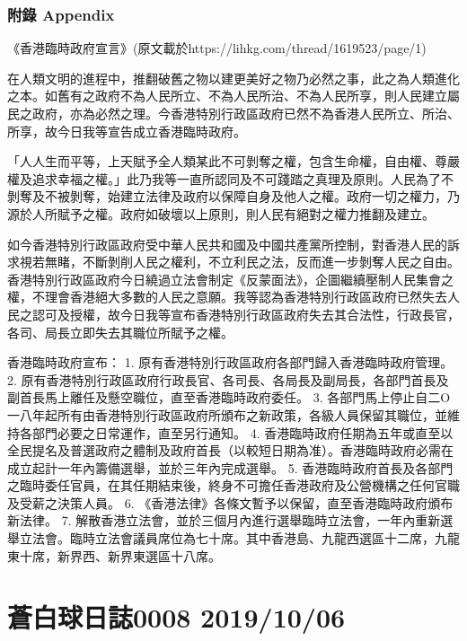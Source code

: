 \documentclass[
]{article}
\begin{document}
\hypertarget{ux9644ux9304-appendix}{%
\subsubsection{附錄 Appendix}\label{ux9644ux9304-appendix}}

《香港臨時政府宣言》(原文載於https://lihkg.com/thread/1619523/page/1)

在人類文明的進程中，推翻破舊之物以建更美好之物乃必然之事，此之為人類進化之本。如舊有之政府不為人民所立、不為人民所治、不為人民所享，則人民建立屬民之政府，亦為必然之理。今香港特別行政區政府已然不為香港人民所立、所治、所享，故今日我等宣告成立香港臨時政府。

「人人生而平等，上天賦予全人類某此不可剝奪之權，包含生命權，自由權、尊嚴權及追求幸福之權。」此乃我等一直所認同及不可踐踏之真理及原則。人民為了不剝奪及不被剝奪，始建立法律及政府以保障自身及他人之權。政府一切之權力，乃源於人所賦予之權。政府如破壞以上原則，則人民有絕對之權力推翻及建立。

如今香港特別行政區政府受中華人民共和國及中國共產黨所控制，對香港人民的訴求視若無睹，不斷剝削人民之權利，不立利民之法，反而進一步剝奪人民之自由。香港特別行政區政府今日繞過立法會制定《反蒙面法》，企圖繼續壓制人民集會之權，不理會香港絕大多數的人民之意願。我等認為香港特別行政區政府已然失去人民之認可及授權，故今日我等宣布香港特別行政區政府失去其合法性，行政長官，各司、局長立即失去其職位所賦予之權。

香港臨時政府宣布： 1. 原有香港特別行政區政府各部門歸入香港臨時政府管理。
2.
原有香港特別行政區政府行政長官、各司長、各局長及副局長，各部門首長及副首長馬上離任及懸空職位，直至香港臨時政府委任。
3.
各部門馬上停止自二O一八年起所有由香港特別行政區政府所頒布之新政策，各級人員保留其職位，並維持各部門必要之日常運作，直至另行通知。
4.
香港臨時政府任期為五年或直至以全民提名及普選政府之體制及政府首長（以較短日期為准）。香港臨時政府必需在成立起計一年內籌備選舉，並於三年內完成選舉。
5.
香港臨時政府首長及各部門之臨時委任官員，在其任期結束後，終身不可擔任香港政府及公營機構之任何官職及受薪之決策人員。
6. 《香港法律》各條文暫予以保留，直至香港臨時政府頒布新法律。 7.
解散香港立法會，並於三個月內進行選舉臨時立法會，一年內重新選舉立法會。臨時立法會議員席位為七十席。其中香港島、九龍西選區十二席，九龍東十席，新界西、新界東選區十八席。

\hypertarget{ux84bcux767dux7403ux65e5ux8a8c0008-20191006}{%
\section{蒼白球日誌0008
2019/10/06}\label{ux84bcux767dux7403ux65e5ux8a8c0008-20191006}}
\end{document}
